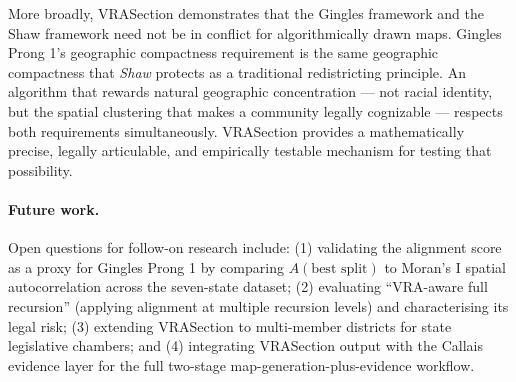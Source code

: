 More broadly, VRASection demonstrates that the Gingles framework and the
Shaw framework need not be in conflict for algorithmically drawn maps.
Gingles Prong 1's geographic compactness requirement is the same
geographic compactness that \emph{Shaw} protects as a traditional redistricting
principle.
An algorithm that rewards natural geographic concentration --- not racial
identity, but the spatial clustering that makes a community legally cognizable
--- respects both requirements simultaneously.
VRASection provides a mathematically precise, legally articulable, and
empirically testable mechanism for testing that possibility.

\paragraph{Future work.}
Open questions for follow-on research include:
(1) validating the alignment score as a proxy for Gingles Prong 1 by
comparing $A(\text{best split})$ to Moran's I spatial autocorrelation
across the seven-state dataset;
(2) evaluating ``VRA-aware full recursion'' (applying alignment at multiple
recursion levels) and characterising its legal risk;
(3) extending VRASection to multi-member districts for state legislative
chambers;
and (4) integrating VRASection output with the Callais evidence layer
for the full two-stage map-generation-plus-evidence workflow.

